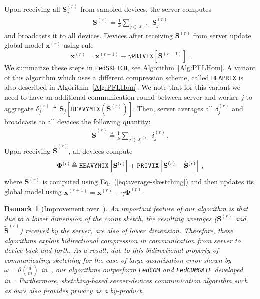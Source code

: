 \documentclass[twoside]{article}
\newtheorem{remark}{Remark}
\begin{document}
Upon receiving all $\mathbf{S}_j^{(r)}$ from sampled devices, the server computes \begin{align}\mathbf{S}^{(r)}=\frac{1}{k}\sum_{j\in\mathcal{K}^{(r)}}\mathbf{S}_j^{(r)}\label{eq:average-skestching}
\end{align} and broadcasts it to all devices. Devices after receiving $\mathbf{S}^{(r)}$ from server update global model $\boldsymbol{x}^{(r)}$ using rule $$\boldsymbol{x}^{(r)}=\boldsymbol{x}^{(r-1)}-\gamma \texttt{PRIVIX}\left[\mathbf{S}^{(r-1)}\right]\, .$$
We summarize these steps in \texttt{FedSKETCH}, see Algorithm~\ref{Alg:PFLHom}. A variant of this algorithm which uses a different compression scheme, called \texttt{HEAPRIX} is also described in Algorithm~\ref{Alg:PFLHom}. We note that for this variant we need to have an additional communication round between server and worker $j$ to aggregate $\delta_j^{(r)}\triangleq \mathbf{S}_j\left[\texttt{HEAVYMIX}(\mathbf{S}^{(r)})\right]$. Then, server averages all $\delta^{(r)}_j$ and broadcasts to all devices the following quantity:
\begin{align}
\tilde{\mathbf{S}}^{(r)}\triangleq \frac{1}{k}\sum_{j\in\mathcal{K}^{(r)}}\delta^{(r)}_j \, .\label{eq:glbl-updts}
\end{align}
Upon receiving $\tilde{\mathbf{S}}^{(r)}$, all devices compute
\begin{align}\notag
    {\mathbf{\Phi}}^{(r)}\triangleq \texttt{HEAVYMIX}\left[{\mathbf{S}}^{(r)}\right]+\texttt{PRIVIX}\left[{\mathbf{S}}^{(r)}- \tilde{\mathbf{S}}^{(r)}\right] \, ,
\end{align}
where $\boldsymbol{S}^{(r)}$ is computed using Eq.~(\ref{eq:average-skestching}) and then updates its  global model using $\boldsymbol{x}^{(r+1)}=\boldsymbol{x}^{(r)}-\gamma{\mathbf{\Phi}}^{(r)}$.

\begin{remark}[Improvement over~\cite{haddadpour2020federated}]\label{rmrk:bidirect}
An important feature of our algorithm is that due to a lower dimension of the count sketch, the resulting averages ($\mathbf{S}^{(r)}$ and  $\tilde{\mathbf{S}}^{(r)}$) received by the server, are also of lower dimension. 
Therefore, these algorithms exploit bidirectional compression in communication from server to device back and forth. 
As a result, due to this bidirectional property of communicating sketching for the case of large quantization error shown by $\omega=\theta(\frac{d}{m})$ in~\cite{haddadpour2020federated}, our algorithms outperform \texttt{FedCOM} and \texttt{FedCOMGATE} developed in~\cite{haddadpour2020federated}. 
Furthermore, sketching-based server-devices communication algorithm such as ours also provides privacy as a by-product.
\end{remark}
\end{document}
